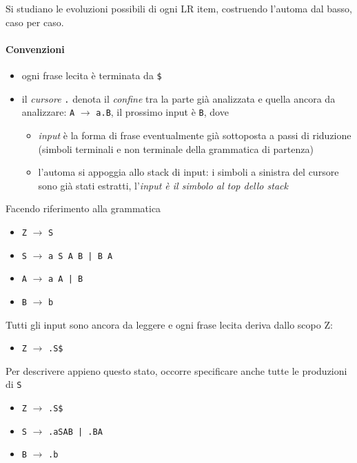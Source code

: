Si studiano le evoluzioni possibili di ogni LR item, costruendo l'automa dal basso, caso per caso.

\paragraph{Convenzioni}
\begin{itemize}
    \item ogni frase lecita è terminata da \texttt{\$}
    \item il \textit{cursore} \texttt{.} denota il \textit{confine} tra la parte già analizzata e quella ancora da analizzare: \texttt{A} $\rightarrow$ \texttt{a.B}, il prossimo input è \texttt{B}, dove
    \begin{itemize}
        \item \textit{input} è la forma di frase eventualmente già sottoposta a passi di riduzione (simboli terminali e non terminale della grammatica di partenza)
        \item l'automa si appoggia allo stack di input: i simboli a sinistra del cursore sono già stati estratti, l'\textit{input è il simbolo al top dello stack}
    \end{itemize}
\end{itemize}
Facendo riferimento alla grammatica
\begin{itemize}
    \item \texttt{Z} $\rightarrow$ \texttt{S}
    \item \texttt{S} $\rightarrow$ \texttt{a S A B | B A}
    \item \texttt{A} $\rightarrow$ \texttt{a A | B}
    \item \texttt{B} $\rightarrow$ \texttt{b}
\end{itemize}
\setlist{}
Tutti gli input sono ancora da leggere e ogni frase lecita deriva dallo scopo Z:
\begin{itemize}
    \item \texttt{Z} $\rightarrow$ \texttt{.S\$}
\end{itemize}
\setlist{}

Per descrivere appieno questo stato, occorre specificare anche tutte le produzioni di \texttt{S}

\begin{itemize}
    \item \texttt{Z} $\rightarrow$ \texttt{.S\$}
    \item \texttt{S} $\rightarrow$ \texttt{.aSAB | .BA}
    \item \texttt{B} $\rightarrow$ \texttt{.b}
\end{itemize}
\setlist{}

